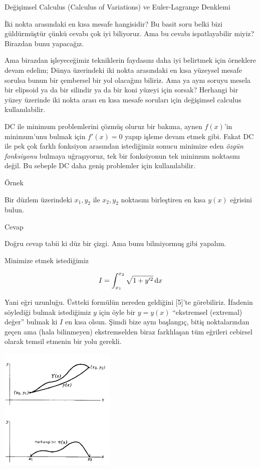 \documentclass[12pt,fleqn]{article}\usepackage{../../common}
\begin{document}
Değişimsel Calculus (Calculus of Variations) ve Euler-Lagrange Denklemi

İki nokta arasındaki en kısa mesafe hangisidir? Bu basit soru belki bizi
güldürmüştür çünkü cevabı çok iyi biliyoruz. Ama bu cevabı ispatlayabilir
miyiz? Birazdan bunu yapacağız. 

Ama birazdan işleyeceğimiz tekniklerin faydasını daha iyi belirtmek için
örneklere devam edelim; Dünya üzerindeki iki nokta arasındaki en kısa
yüzeysel mesafe sorulsa bunun bir çembersel bir yol olacağını biliriz. Ama
ya aynı soruyu mesela bir elipsoid ya da bir silindir ya da bir koni yüzeyi
için sorsak? Herhangi bir yüzey üzerinde iki nokta arası en kısa mesafe
soruları için değişimsel calculus kullanılabilir.

DC ile  minimum problemlerini çözmüş oluruz bir bakıma, aynen $f(x)$'in
minimum'unu bulmak için $f'(x) = 0$ yapıp işleme devam etmek gibi. Fakat DC
ile pek çok farklı fonksiyon arasından istediğimiz sonucu minimize eden
{\em özgün fonksiyonu} bulmaya uğraşıyoruz, tek bir fonksiyonun tek minimum
noktasını değil. Bu sebeple DC daha geniş problemler için kullanılabilir.

Örnek

Bir düzlem üzerindeki $x_1,y_2$ ile $x_2,y_2$ noktasını birleştiren en kısa
$y(x)$ eğrisini bulun.

Cevap

Doğru cevap tabii ki düz bir çizgi. Ama bunu bilmiyormuş gibi yapalım. 

Minimize etmek istediğimiz 

$$
I = \int _{x_1}^{x_2} \sqrt{ 1 + y'^2} \,\mathrm{d} x
$$

Yani eğri uzunluğu. Üstteki formülün nereden geldiğini [5]'te
görebiliriz. İfadenin söylediği bulmak istediğimiz $y$ için öyle bir
$y = y(x)$ ``ekstremsel (extremal) değer'' bulmak ki $I$ en kısa
olsun. Şimdi bize aynı başlangıç, bitiş noktalarından geçen ama (hala
bilinmeyen) ekstremselden biraz farklılaşan tüm eğrileri cebirsel olarak
temsil etmenin bir yolu gerekli.

\includegraphics[width=15em]{phy_varcalc_01.png}
\end{document}
